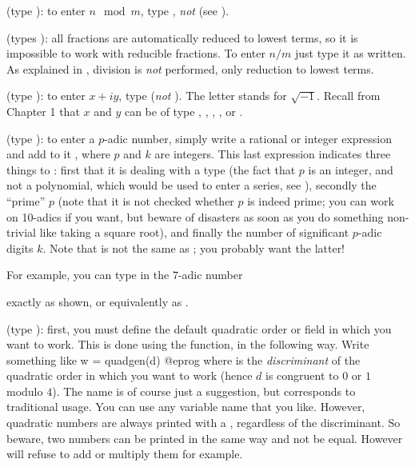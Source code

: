 (type ): to enter $n \mod m$, type
, \emph{not}  (see ).

(types ): all fractions are automatically reduced to lowest
terms, so it is impossible to work with reducible fractions. To enter $n/m$
just type it as written. As explained in , division is
\emph{not} performed, only reduction to lowest terms.\label{se:FRAC}

 (type ): to
enter $x+iy$, type  (\emph{not} ). The letter 
stands for $\sqrt{-1}$. Recall from Chapter 1 that $x$ and $y$ can be of type
, , , , or .

\label{se:padic} (type
): to enter a $p$-adic number, simply write a rational or
integer expression and add to it , where $p$ and $k$ are
integers. This last expression indicates three things to : first that
it is dealing with a  type (the fact that $p$ is an integer, and
not a polynomial, which would be used to enter a series, see
), secondly the ``prime'' $p$ (note that it is not checked
whether $p$ is indeed prime; you can work on 10-adics if you want, but beware
of disasters as soon as you do something non-trivial like taking a square
root), and finally the number of significant $p$-adic digits $k$. Note that
 is not the same as ; you probably want the
latter!

For example, you can type in the $7$-adic number


\noindent exactly as shown, or equivalently as .

 (type ): first,
you must define the default quadratic order or field in which you want to
work. This is done using the  function, in the following way.
Write something like
\bprog
w = quadgen(d)
@eprog\noindent
where  is the \emph{discriminant} of the quadratic order in
which you want to work (hence $d$ is congruent to $0$ or $1$ modulo $4$). The
name  is of course just a suggestion, but corresponds to traditional
usage. You can use any variable name that you like. However,
quadratic numbers are always printed with a , regardless of the
discriminant. So beware, two numbers can be printed in the same way and not
be equal. However  will refuse to add or multiply them for example.

